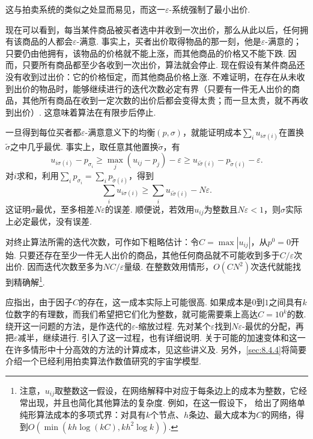 这与拍卖系统的类似之处显而易见，而这一$\varepsilon$-系统强制了最小出价.

现在可以看到，每当某件商品被买者选中并收到一次出价，那么从此以后，任何拥有该商品的人都会$\varepsilon$-满意. 事实上，买者出价取得物品的那一刻，他是$\varepsilon$-满意的；只要仍由他拥有，该物品的价格就不能上涨，而其他商品的价格又不能下跌. 因而，只要所有商品都至少各收到一次出价，算法就会停止. 现在假设有某件商品还没有收到过出价：它的价格恒定，而其他商品价格上涨. 不难证明，在存在从未收到出价的物品时，能够继续进行的迭代次数必定有界（只要有一件无人出价的商品，其他所有商品在收到一定次数的出价后都会变得太贵；而一旦太贵，就不再收到出价）. 这意味着算法在有限步后停止.

一旦得到每位买者都$\varepsilon$-满意意义下的均衡$(p,\sigma)$，就能证明成本$\sum_i u_{i\sigma(i)}$在置换$\tilde\sigma$之中几乎最优. 事实上，取任意其他置换$\tilde\sigma$，有
\[
u_{i\sigma(i)}-p_{\sigma_i}
\ge\max_j(u_{ij}-p_j)-\varepsilon
\ge u_{i\tilde\sigma(i)}-p_{\tilde\sigma(i)}-\varepsilon.
\]
对$i$求和，利用$\sum_i p_{\sigma_i}=\sum_i p_{\tilde\sigma(i)}$，得到
\[
\sum_i u_{i\sigma(i)}\ge\sum_i u_{i\tilde\sigma(i)}-N\varepsilon.
\]
这证明$\sigma$最优，至多相差$N\varepsilon$的误差. 顺便说，若效用$u_{ij}$为整数且$N\varepsilon<1$，则$\sigma$实际上必定最优，没有误差.

对终止算法所需的迭代次数，可作如下粗略估计：令$C=\max|u_{ij}|$，从$p^0=0$开始. 只要还存在至少一件无人出价的商品，其他任何商品就不可能收到多于$C/\varepsilon$次出价. 因而迭代次数至多为$NC/\varepsilon$量级. 在整数效用情形，$O(CN^2)$次迭代就能找到精确解\footnote{注意，$u_{ij}$取整数这一假设，在网络解释中对应于每条边上的成本为整数，它经常出现，并且也简化其他算法的复杂度. 例如，在这一假设下，\cite{b245}\label{idx:i106-p239}
给出了网络单纯形算法成本的多项式界：对具有$k$个节点、$h$条边、最大成本为$C$的网络，得到$O(\min(kh\log(kC),kh^2\log k))$.}.

应指出，由于因子$C$的存在，这一成本实际上可能很高. 如果成本是$0$到$1$之间具有$k$位数字的有理数，而我们希望把它们化为整数，就可能需要乘上高达$C=10^k$的数. 绕开这一问题的方法，是作迭代的$\varepsilon$-缩放过程. 先对某个$\varepsilon$找到$N\varepsilon$-最优的分配，再把$\varepsilon$减半，继续进行. \cite{b55}引入了这一过程，\cite{b234}也有详细说明. 关于可能的加速变体和这一在许多情形中十分高效的方法的计算成本，见这些讲义及\cite{b54}. 另外，\autoref{sec:8.4.4}将简要介绍一个已经利用拍卖算法作数值研究的宇宙学模型.

